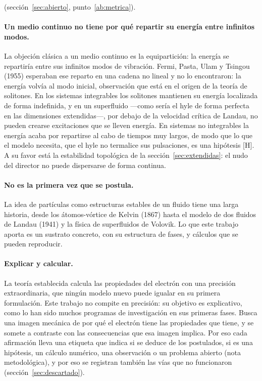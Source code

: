 \documentclass[11pt,a4paper]{article}
\newcommand{\st}[1]{\textup{[#1]}}
\newcommand{\apartado}[1]{\paragraph{#1}}
\begin{document}
(sección~\ref{sec:abierto}, punto~\ref{ab:metrica}).

\apartado{Un medio continuo no tiene por qué repartir su energía entre infinitos modos.} La objeción clásica a un medio continuo es la equipartición: la energía se repartiría entre sus infinitos modos de vibración. Fermi, Pasta, Ulam y Tsingou (1955) esperaban ese reparto en una cadena no lineal y no lo encontraron: la energía volvía al modo inicial, observación que está en el origen de la teoría de solitones. En los sistemas integrables los solitones mantienen su energía localizada de forma indefinida, y en un superfluido ---como sería el hyle de forma perfecta en las dimensiones extendidas---, por debajo de la velocidad crítica de Landau, no pueden crearse excitaciones que se lleven energía. En sistemas no integrables la energía acaba por repartirse al cabo de tiempos muy largos, de modo que lo que el modelo necesita, que el hyle no termalice sus pulsaciones, es una hipótesis \st{H}. A su favor está la estabilidad topológica de la sección~\ref{sec:extendidas}: el nudo del director no puede dispersarse de forma continua.

\apartado{No es la primera vez que se postula.} La idea de partículas como estructuras estables de un fluido tiene una larga historia, desde los átomos-vórtice de Kelvin (1867) hasta el modelo de dos fluidos de Landau (1941) y la física de superfluidos de Volovik. Lo que este trabajo aporta es un sustrato concreto, con su estructura de fases, y cálculos que se pueden reproducir.

\apartado{Explicar y calcular.} La teoría establecida calcula las propiedades del electrón con una precisión extraordinaria, que ningún modelo nuevo puede igualar en su primera formulación. Este trabajo no compite en precisión: su objetivo es explicativo, como lo han sido muchos programas de investigación en sus primeras fases. Busca una imagen mecánica de por qué el electrón tiene las propiedades que tiene, y se somete a contraste con las consecuencias que esa imagen implica. Por eso cada afirmación lleva una etiqueta que indica si se deduce de los postulados, si es una hipótesis, un cálculo numérico, una observación o un problema abierto (nota metodológica), y por eso se registran también las vías que no funcionaron (sección~\ref{sec:descartado}).
\end{document}
